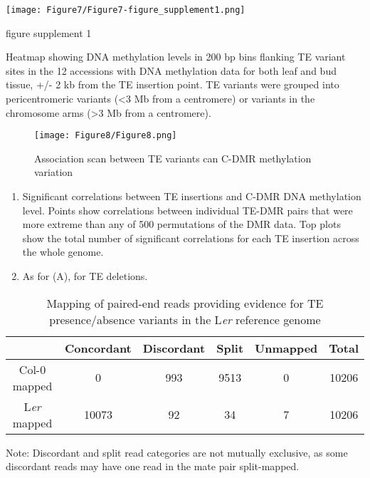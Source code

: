 \documentclass[12pt]{article}
\begin{document}
\pagebreak


\setcounter{suppfigure}{6}

\begin{suppfigure}
  \centering
  \texttt{[image: Figure7/Figure7-figure\_supplement1.png]}
  \caption{figure supplement 1}
  \label{fig7s1}
\end{suppfigure}

Heatmap showing DNA methylation levels in 200 bp bins flanking TE
variant sites in the 12 accessions with DNA methylation data for both
leaf and bud tissue, +/- 2 kb from the TE insertion point. TE variants
were grouped into pericentromeric variants (\textless{}3 Mb from a
centromere) or variants in the chromosome arms (\textgreater{}3 Mb from
a centromere).

\pagebreak


\begin{figure}[!ht]
  \centering
  \texttt{[image: Figure8/Figure8.png]}
  \caption{Association scan between TE variants can C-DMR methylation variation}
  \label{fig8}
\end{figure}

\begin{enumerate}
\def\labelenumi{(\Alph{enumi})}
\item
  Significant correlations between TE insertions and C-DMR DNA
  methylation level. Points show correlations between individual TE-DMR
  pairs that were more extreme than any of 500 permutations of the DMR
  data. Top plots show the total number of significant correlations for
  each TE insertion across the whole genome.
\item
  As for (A), for TE deletions.
\end{enumerate}

\pagebreak

\begin{table}[h]
  \centering
  \begin{threeparttable}
    \caption{Mapping of paired-end reads providing evidence for TE presence/absence
      variants in the L\emph{er} reference genome}
    \label{table1}
    \begin{tabular}{@{}cccccc@{}}
      \toprule
      \textbf{}  & \textbf{Concordant} & \textbf{Discordant} & \textbf{Split} & \textbf{Unmapped} & \textbf{Total} \\ \midrule
      Col-0 mapped & 0 & 993 & 9513 & 0 & 10206 \\
      L\emph{er} mapped & 10073 & 92 & 34 & 7 & 10206 \\ \bottomrule
    \end{tabular}
    \begin{tablenotes}
      \small
    \item Note: Discordant and split read categories are not mutually exclusive, as some discordant reads may have one read in the mate pair split-mapped.
    \end{tablenotes}
  \end{threeparttable}
\end{table}
\end{document}
